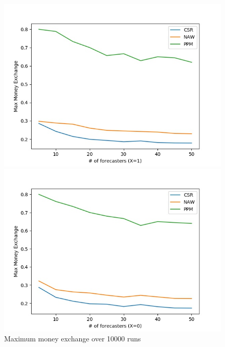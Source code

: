 \documentclass[english,10pt]{article}
\begin{document}
\begin{enumerate}
\begin{enumerate}
        	\begin{figure}[H]
        	\centering
        	\begin{minipage}{0.48\textwidth}
        	\includegraphics[width = \textwidth]{(uniform)Max_MnEx(X=1).jpg}
        	\end{minipage}
        	\begin{minipage}{0.48\textwidth}
        	\includegraphics[width = \textwidth]{(uniform)Max_MnEx(X=0).jpg}
        	\end{minipage}
        	\caption{Maximum money exchange over 10000 runs}
        	\end{figure}
        	

\end{enumerate}
\end{enumerate}
\end{document}
